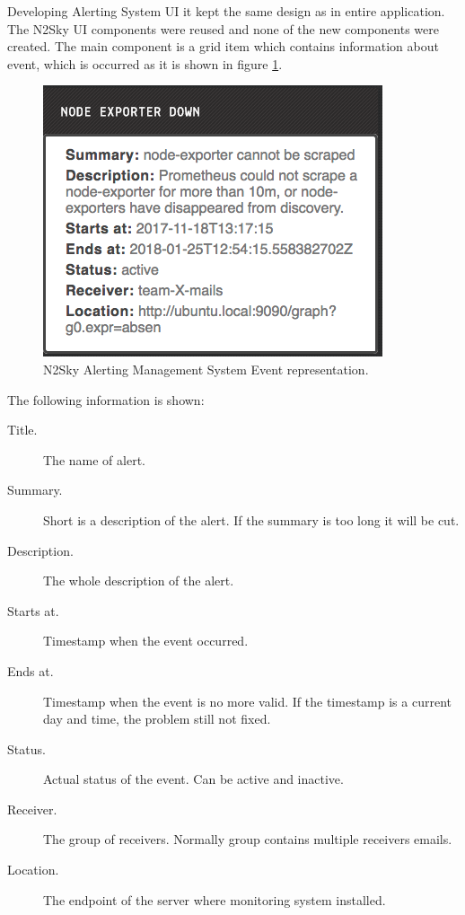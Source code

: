 Developing Alerting System UI it kept the same design as in entire application. The N2Sky UI components were reused and none of the new components were created. The main component is a grid item which contains information about event, which is occurred  as it is shown in figure \ref{fig:alert_grid}.

\begin{figure}[htbp]
\begin{center}
  \includegraphics[scale=0.7]{components/3/alerts/alert_grid.png}
  \caption{N2Sky Alerting Management System Event representation.}
  \label{fig:alert_grid}
\end{center}
\end{figure}

The following information is shown:

\begin{description}
\item[Title.] The name of alert.
\item[Summary.]   Short is a description of the alert. If the summary is too long it will be cut.
\item[Description.] The whole description of the alert.
\item[Starts at.] Timestamp when the event occurred. 
\item[Ends at.] Timestamp when the event is no more valid. If the timestamp is a current day and time, the problem still not fixed. 
\item[Status.] Actual status of the event. Can be active and inactive.
\item[Receiver.] The group of receivers. Normally group contains multiple receivers emails. 
\item[Location.] The endpoint of the server where monitoring system installed. 
\end{description}

